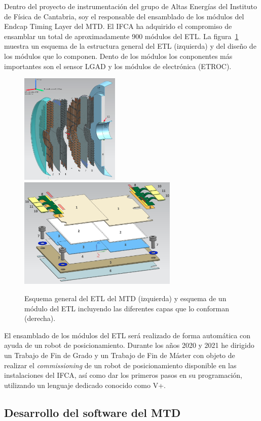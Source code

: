 Dentro del proyecto de instrumentación del grupo de Altas Energías del Instituto de Física de Cantabria, soy el responsable del ensamblado de los módulos del Endcap Timing Layer del MTD. El IFCA ha adquirido el compromiso de ensamblar un total de aproximadamente 900 módulos del ETL. La figura~\ref{fig:etl} muestra un esquema de la estructura general del ETL (izquierda) y del diseño de los módulos que lo componen. Dento de los módulos los conponentes más importantes son el sensor LGAD y los módulos de electrónica (ETROC). 

\begin{figure}[ht]
\centering
\includegraphics[height=5.3cm]{fig/etloverview.png}
\includegraphics[height=5.3cm]{fig/etlmodule.png}
\caption{Esquema general del ETL del MTD (izquierda) y esquema de un módulo del ETL incluyendo las diferentes capas que lo conforman (derecha).}
\label{fig:etl}
\end{figure} 

El ensamblado de los módulos del ETL será realizado de forma automática con ayuda de un robot de posicionamiento. Durante los años 2020 y 2021 he dirigido un Trabajo de Fin de Grado y un Trabajo de Fin de Máster con objeto de realizar el \emph{commissioning} de un robot de posicionamiento disponible en las instalaciones del IFCA, así como dar los primeros pasos en su programación, utilizando un lenguaje dedicado conocido como V+.  

\subsection{Desarrollo del software del MTD}

